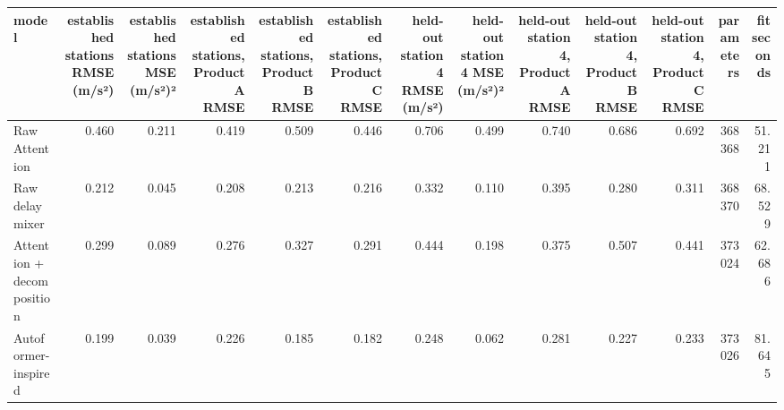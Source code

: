 \begin{tabular}{lrrrrrrrrrrrr}
\toprule
model & established stations RMSE (m/s²) & established stations MSE (m/s²)² & established stations, Product A RMSE & established stations, Product B RMSE & established stations, Product C RMSE & held-out station 4 RMSE (m/s²) & held-out station 4 MSE (m/s²)² & held-out station 4, Product A RMSE & held-out station 4, Product B RMSE & held-out station 4, Product C RMSE & parameters & fit seconds \\
\midrule
Raw Attention & 0.460 & 0.211 & 0.419 & 0.509 & 0.446 & 0.706 & 0.499 & 0.740 & 0.686 & 0.692 & 368368 & 51.211 \\
Raw delay mixer & 0.212 & 0.045 & 0.208 & 0.213 & 0.216 & 0.332 & 0.110 & 0.395 & 0.280 & 0.311 & 368370 & 68.529 \\
Attention + decomposition & 0.299 & 0.089 & 0.276 & 0.327 & 0.291 & 0.444 & 0.198 & 0.375 & 0.507 & 0.441 & 373024 & 62.686 \\
Autoformer-inspired & 0.199 & 0.039 & 0.226 & 0.185 & 0.182 & 0.248 & 0.062 & 0.281 & 0.227 & 0.233 & 373026 & 81.645 \\
\bottomrule
\end{tabular}
